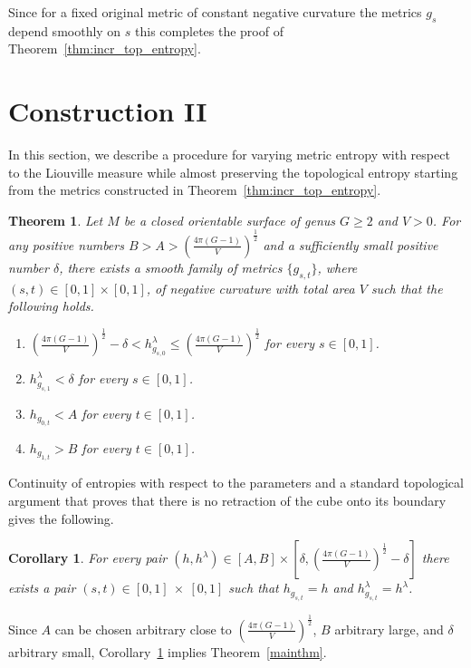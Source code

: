 \documentclass[12pt]{article}
\numberwithin{equation}{section}
\newtheorem{thm}{Theorem}
\newtheorem{cor}[lem]{Corollary}
\theoremstyle{definition}
\begin{document}
Since for a fixed original metric of constant negative curvature  the metrics $g_s$  depend smoothly on $s$  this completes the proof of Theorem~\ref{thm:incr_top_entropy}.


\section{Construction II}\label{constr3}


In this section, we describe a procedure for varying metric entropy with respect to the Liouville measure while almost preserving the topological entropy starting from the metrics constructed in Theorem~\ref{thm:incr_top_entropy}.

\begin{thm}\label{thm:var_metr_pres_top}
Let $M$ be a closed  orientable surface of genus $G\geq 2$ and $V>0$. For any positive numbers $B>A>\left(\frac{4\pi(G-1)}{V}\right)^{\frac{1}{2}}$ and  a sufficiently small positive number $\delta$, there exists a smooth family of metrics $\{g_{s,t}\}$, where $(s,t)\in [0,1]\times[0,1]$, of negative curvature with total area $V$ such that the following holds.
\begin{enumerate}
\item\label{D1} $\left(\frac{4\pi(G-1)}{V}\right)^{\frac{1}{2}}-\delta< h^\lambda_{g_{s,0}}\leqslant\left(\frac{4\pi(G-1)}{V}\right)^{\frac{1}{2}}$ for every $s\in[0,1]$.
\item\label{D2} $h^\lambda_{g_{s,1}}<\delta$ for every $s\in[0,1]$.
\item\label{D3} $h_{g_{0,t}}<A$ for every $t\in[0,1]$.
\item\label{D4} $h_{g_{1,t}}>B$ for every $t\in[0,1]$.
\end{enumerate}
\end{thm}

Continuity of entropies with respect to the parameters and a standard topological argument that proves that there is no retraction of the cube onto its boundary gives the following.

\begin{cor}\label{coro} For every pair $(h,h^\lambda)\in[A,B]\times[\delta, \left(\frac{4\pi(G-1)}{V}\right)^{\frac{1}{2}}-\delta]$ there exists a pair $(s,t)\in [0,1]~\times~[0,1]$ such that $h_{g_{s,t}} = h$ and $h^\lambda_{g_{s,t}} = h^\lambda$.
\end{cor}

Since $A$ can be chosen arbitrary close to $\left(\frac{4\pi(G-1)}{V}\right)^{\frac{1}{2}}$, $B$ arbitrary large, and $\delta$ arbitrary small, Corollary~\ref{coro} implies Theorem~\ref{mainthm}.
\end{document}
